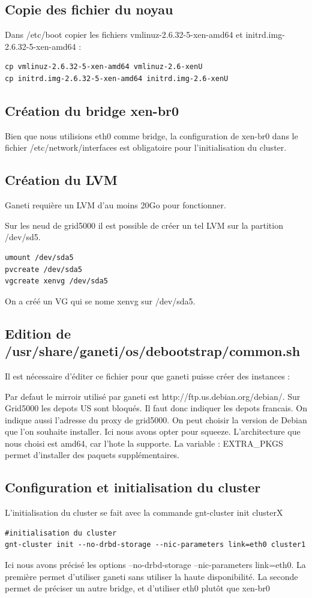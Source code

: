 \subsection {Copie des fichier du noyau}
Dans /etc/boot copier les fichiers vmlinuz-2.6.32-5-xen-amd64 et initrd.img-2.6.32-5-xen-amd64 :
\begin{lstlisting}
cp vmlinuz-2.6.32-5-xen-amd64 vmlinuz-2.6-xenU
cp initrd.img-2.6.32-5-xen-amd64 initrd.img-2.6-xenU
\end{lstlisting}

\subsection {Création du bridge xen-br0}

Bien que nous utilisions eth0 comme bridge, la configuration de xen-br0 dans le fichier /etc/network/interfaces est obligatoire pour l'initialisation du cluster. 

\subsection {Création du LVM}

Ganeti requière un LVM d'au moins 20Go pour fonctionner.

Sur les neud de grid5000 il est possible de créer un tel LVM sur la partition /dev/sd5.
\begin{lstlisting}
umount /dev/sda5
pvcreate /dev/sda5
vgcreate xenvg /dev/sda5
\end{lstlisting}
On a créé un VG qui se nome xenvg sur /dev/sda5.

\subsection {Edition de /usr/share/ganeti/os/debootstrap/common.sh}

Il est nécessaire d'éditer ce fichier pour que ganeti puisse créer des instances :

Par defaut le mirroir utilisé par ganeti est http://ftp.us.debian.org/debian/. Sur Grid5000 les depots US sont bloqués. Il faut donc indiquer les depots francais.
On indique aussi l'adresse du  proxy de grid5000.
On peut choisir la version de Debian que l'on souhaite installer. Ici nous avons opter pour squeeze.
L'architecture que nous choisi est amd64, car l'hote la supporte.
La variable : EXTRA\_PKGS permet d'installer des paquets supplémentaires.

\subsection {Configuration et initialisation du cluster}
L'initialisation du cluster se fait avec la commande gnt-cluster init clusterX
\begin{lstlisting}
#initialisation du cluster
gnt-cluster init --no-drbd-storage --nic-parameters link=eth0 cluster1
\end{lstlisting}
Ici nous avons précisé les options --no-drbd-storage --nic-parameters link=eth0.
La première permet d'utiliser ganeti sans utiliser la haute disponibilité.
La seconde permet de préciser un autre bridge, et d'utiliser eth0 plutôt que xen-br0

